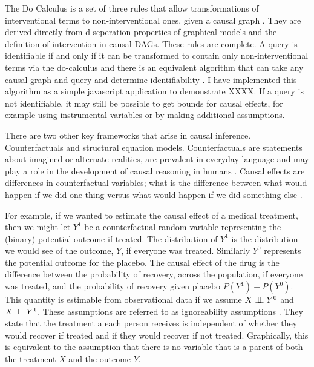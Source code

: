 \documentclass[11pt,a4paper]{article}
\begin{document}
The Do Calculus is a set of three rules that allow transformations of interventional terms to non-interventional ones, given a causal graph \cite{}. They are derived directly from d-seperation properties of graphical models and the definition of intervention in causal DAGs. These rules are complete. A query is identifiable if and only if it can be transformed to contain only non-interventional terms via the do-calculus and there is an equivalent algorithm that can take any causal graph and query and determine identifiability \cite {}. I have implemented this algorithm as a simple javascript application to demonstrate XXXX. If a query is not identifiable, it may still be possible to get bounds for causal effects, for example using instrumental variables \cite{} or by making additional assumptions. 

There are two other key frameworks that arise in causal inference. Counterfactuals and structural equation models.  Counterfactuals are statements about imagined or alternate realities, are prevalent in everyday language and may play a role in the development of causal reasoning in humans \cite{Weisberg2013}. Causal effects are differences in counterfactual variables; what is the difference between what would happen if we did one thing versus what would happen if we did something else \cite{Rubin1974,Rubin1978,Rosenbaum1983, Rubin2005,Rubin2008}. 

For example, if we wanted to estimate the causal effect of a medical treatment, then we might let $Y^{1}$ be a counterfactual random variable representing the (binary) potential outcome if treated. The distribution of $Y^{1}$ is the distribution we would see of the outcome, $Y$, if everyone was treated. Similarly $Y^{0}$ represents the potential outcome for the placebo. The causal effect of the drug is the difference between the probability of recovery, across the population, if everyone was treated, and the probability of recovery given placebo $P(Y^{1})-P(Y^{0})$. This quantity is estimable from observational data if we assume $X \perp\!\!\!\perp Y^{0}$ and $X \perp\!\!\!\perp Y^{1}$. These assumptions are referred to as ignoreability assumptions \cite{Rosenbaum1983}. They state that the treatment a each person receives is independent of whether they would recover if treated and if they would recover if not treated. Graphically, this is equivalent to the assumption that there is no variable that is a parent of both the treatment $X$ and the outcome $Y$. 
\end{document}
